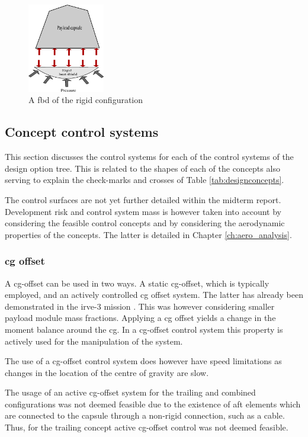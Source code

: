 \begin{figure}[H]
\centering
\includegraphics[width = 0.3\textwidth]{Figure/FBD_rigid.eps}
\caption{A \gls{fbd} of the rigid configuration}
\label{fig:fbd_rigid}
\end{figure}

\subsection{Concept control systems} \label{sec:ccs}
This section discusses the control systems for each of the control systems of the design option tree. This is related to the shapes of each of the concepts also serving to explain the check-marks and crosses of Table \ref{tab:designconcepts}. 

The control surfaces are not yet further detailed within the midterm report. Development risk and control system mass is however taken into account by considering the feasible control concepts and by considering the aerodynamic properties of the concepts. The latter is detailed in Chapter \ref{ch:aero_analysis}.

\subsubsection{\gls{cg} offset}
A \acrfull{cg}-offset can be used in two ways. A static \gls{cg}-offset, which is typically employed, and an actively controlled \gls{cg} offset system. The latter has already been demonstrated in the \gls{irve}-3 mission \cite{Dillman2012}. This was however considering smaller payload module mass fractions. Applying a \gls{cg} offset yields a change in the moment balance around the \gls{cg}. In a \gls{cg}-offset control system this property is actively used for the manipulation of the system. 

The use of a \gls{cg}-offset control system does however have speed limitations as changes in the location of the centre of gravity are slow.

The usage of an active \gls{cg}-offset system for the trailing and combined configurations was not deemed feasible due to the existence of aft elements which are connected to the capsule through a non-rigid connection, such as a cable. Thus, for the trailing concept active \gls{cg}-offset control was not deemed feasible.


